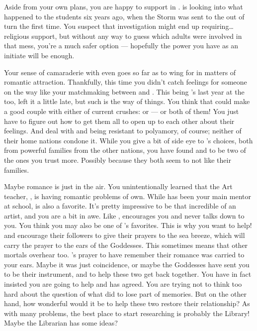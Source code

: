 \documentclass[char]{GL2020}
\begin{document}
Aside from your own plans, you are happy to support \cPresident{} in \cPresident{\theirs}. \cPresident{} is looking into what happened to the students six years ago, when the Storm was sent to the \pShip{} out of turn the first time. You suspect that investigation might end up requiring\ldots{} religious support, but without any way to guess which adults were involved in that mess, you're a much safer option — hopefully the power you have as an initiate will be enough.

Your sense of camaraderie with \cPresident{} even goes so far as to wing\cInitiate{\person} for \cPresident{\them} in matters of romantic attraction. Thankfully, this time you didn’t catch feelings for someone on the way like your matchmaking between \cTechStar{} and \cWarlordDaughter{}. This being \cPresident{}'s last year at the \pSc{} too, \cPresident{\they} \cPresident{\have} left it a little late, but such is the way of things. You think that \cPresident{} could make a good couple with either of \cPresident{\their} current crushes: \cHeir{\full} or \cChupStudent{\full} — or both of them! You just have to figure out how to get them all to open up to each other about their feelings. And deal with \cHeir{} and \cChupStudent{} being resistant to polyamory, of course; neither of their home nations condone it. While you give a bit of side eye to \cPresident{}’s choices, both from powerful families from the other nations, you have found \cHeir{} and \cChupStudent{} to be two of the ones you trust more. Possibly because they both seem to not like their families.  

Maybe romance is just in the air. You unintentionally learned that the Art teacher, \cChupAvenger{\full}, is having romantic problems of \cChupAvenger{\their} own. While \cFlowPriest{} has been your main mentor at school, \cChupAvenger{} is also a favorite. It's pretty impressive to be that incredible of an artist, and you are a bit in awe. Like \cBunker{}, \cChupAvenger{} encourages you and never talks down to you. You think you may also be one of \cChupAvenger{}’s favorites. This is why you want to help! \cEbb{} and \cFlow{} encourage their followers to give their prayers to the sea breeze, which will carry the prayer to the ears of the Goddesses. This sometimes means that other mortals overhear too. \cChupAvenger{}'s prayer to have \cHeadScientist{\full} remember their romance was carried to your ears. Maybe it was just coincidence, or maybe the Goddesses have sent you to be their instrument, and to help these two get back together. You have in fact insisted you are going to help and \cChupAvenger{} has agreed. You are trying not to think too hard about the question of what \cHeadScientist{} did to lose part of \cHeadScientist{\their} memories. But on the other hand, how wonderful would it be to help these two restore their relationship? As with many problems, the best place to start researching is probably the Library! Maybe the Librarian \cLibrarian{\full} has some ideas?
\end{document}
